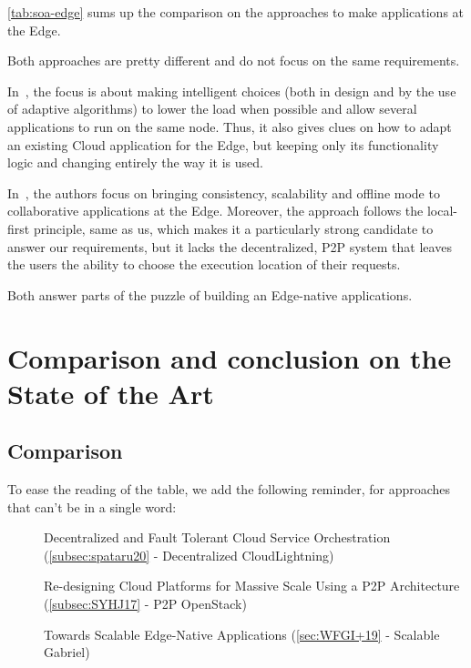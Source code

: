 \autoref{tab:soa-edge} sums up the comparison on the approaches to
make applications at the Edge.

Both approaches are pretty different and do not focus on the same
requirements.

%
In~\cite{WFGI+19}, the focus is about making intelligent choices (both
in design and by the use of adaptive algorithms) to lower the load
when possible and allow several applications to run on the same node.
%
Thus, it also gives clues on how to adapt an existing Cloud
application for the Edge, but keeping only its functionality logic and
changing entirely the way it is used.

%
In~\cite{TSS21}, the authors focus on bringing consistency,
scalability and offline mode to collaborative applications at the
Edge.
%
Moreover, the approach follows the local-first principle, same as us,
which makes it a particularly strong candidate to answer our
requirements, but it lacks the decentralized, \acrshort{P2P} system
that leaves the users the ability to choose the execution location of
their requests.


Both answer parts of the puzzle of building an Edge-native
applications.




\chapter{Comparison and conclusion on the State of the Art}
\label{chap:soa-conclusion}

\section{Comparison }
\label{sec:soa-comparison}


To ease the reading of the table, we add the following reminder, for
approaches that can't be in a single word:
\begin{description}
\item [\cite{Spataru20}] Decentralized and Fault Tolerant Cloud
  Service Orchestration (\autoref{subsec:spataru20} - Decentralized
  CloudLightning)
\item [\cite{SYHJ17}] Re-designing Cloud Platforms for Massive Scale
  Using a P2P Architecture (\autoref{subsec:SYHJ17} - P2P OpenStack)
\item [\cite{WFGI+19}] Towards Scalable Edge-Native Applications
  (\autoref{sec:WFGI+19} - Scalable Gabriel)
\end{description}

